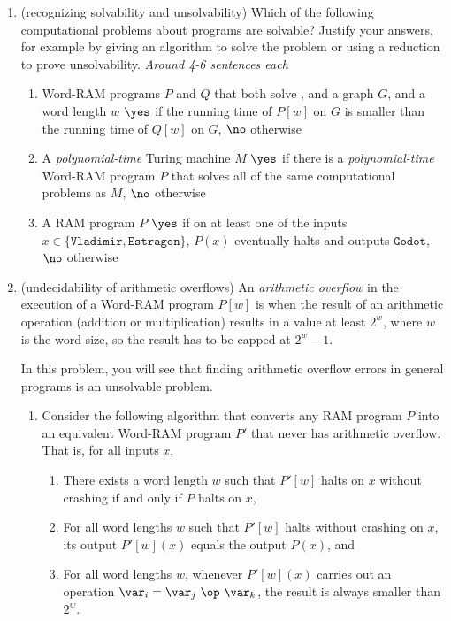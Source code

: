 \documentclass[11pt]{article}
\begin{document}
\begin{enumerate}
\item (recognizing solvability and unsolvability)
Which of the following computational problems about programs are solvable?  Justify your answers, for example by giving an algorithm to solve the problem or using a reduction to prove unsolvability. \textit{Around 4-6 sentences each}
\begin{enumerate}
\item
\compprob{\WhichAlgorithmIsFaster}
{Word-RAM programs $P$ and $Q$ that both solve \GraphThreeColoring, and a graph $G$, and a word length $w$}
{$\yes$ if the running time of $P[w]$ on $G$ is smaller than the running time of $Q[w]$ on $G$, $\no$ otherwise}

\item
\compprob{\TMvsWordRAM}
{A {\em polynomial-time} Turing machine $M$}
{$\yes$ if there is a {\em polynomial-time} Word-RAM program $P$ that solves all of the same computational problems as $M$, $\no$ otherwise}

\item
\compprob{\WaitingForGodot}
{A RAM program $P$}
{$\yes$ if on at least one of the inputs $x\in \{\texttt{Vladimir}, \texttt{Estragon}\}$, $P(x)$ eventually halts and outputs $\texttt{Godot}$, $\no$ otherwise}
\end{enumerate}

\item (undecidability of arithmetic overflows)
An {\em arithmetic overflow} in the execution of a Word-RAM program $P[w]$ is when the result of an arithmetic operation (addition or multiplication) results in a value at least $2^w$, where $w$ is the word size, so the result has to be capped at $2^w-1$.

In this problem, you will see that finding arithmetic overflow errors in general programs is an unsolvable problem.

\begin{enumerate}
    \item Consider the following algorithm that converts any RAM program $P$ into an equivalent Word-RAM program $P'$ that never has arithmetic overflow.  That is, for all inputs $x$,
    \begin{enumerate}[label=C\arabic*]
        \item There exists a word length $w$ such that $P'[w]$ halts on $x$ without crashing if and only if $P$ halts on $x$,
        \item For all word lengths $w$ such that $P'[w]$ halts without crashing on $x$, its output $P'[w](x)$ equals the output $P(x)$, and
        \item For all word lengths $w$, whenever $P'[w](x)$ carries out an operation $\var_i = \var_j\ \op\ \var_k$, the result is always smaller than $2^w$.
    \end{enumerate}


\end{enumerate}
\end{enumerate}
\end{document}
